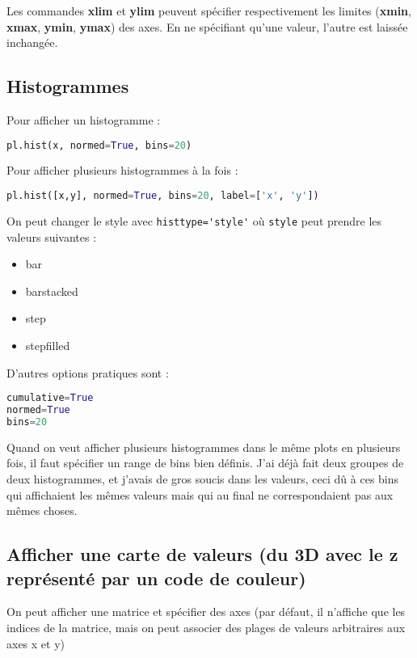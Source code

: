 \documentclass[a4paper,twoside]{article}
\begin{document}
Les commandes \textbf{xlim} et \textbf{ylim} peuvent spécifier respectivement les limites (\textbf{xmin}, \textbf{xmax}, \textbf{ymin}, \textbf{ymax}) des axes. En ne spécifiant qu'une valeur, l'autre est laissée inchangée.


\subsection{Histogrammes}
Pour afficher un histogramme :
\begin{lstlisting}[language=python]
pl.hist(x, normed=True, bins=20)
\end{lstlisting}

Pour afficher plusieurs histogrammes à la fois :
\begin{lstlisting}[language=python]
pl.hist([x,y], normed=True, bins=20, label=['x', 'y'])
\end{lstlisting}

\bigskip

On peut changer le style avec \verb|histtype='style'| où \verb|style| peut prendre les valeurs suivantes :
\begin{itemize}
\item bar
\item barstacked
\item step
\item stepfilled
\end{itemize}

D'autres options pratiques sont :
\begin{lstlisting}[language=python]
cumulative=True
normed=True
bins=20
\end{lstlisting}

\begin{attention}
Quand on veut afficher plusieurs histogrammes dans le même plots en plusieurs fois, il faut spécifier un range de bins bien définis. J'ai déjà fait deux groupes de deux histogrammes, et j'avais de gros soucis dans les valeurs, ceci dû à ces bins qui affichaient les mêmes valeurs mais qui au final ne correspondaient pas aux mêmes choses.
\end{attention}


\subsection{Afficher une carte de valeurs (du 3D avec le z représenté par un code de couleur)}
On peut afficher une matrice et spécifier des axes (par défaut, il n'affiche que les indices de la matrice, mais on peut associer des plages de valeurs arbitraires aux axes x et y)
\end{document}
